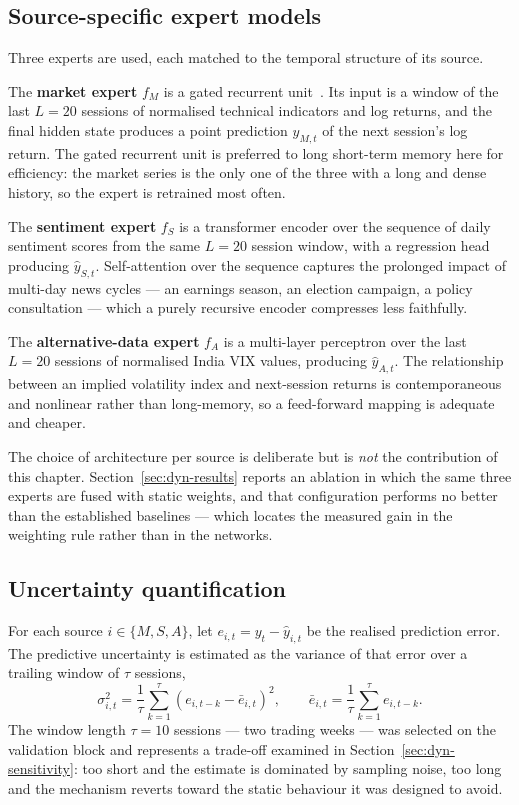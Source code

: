 \subsection{Source-specific expert models}

Three experts are used, each matched to the temporal structure of its source.

The \textbf{market expert} $f_M$ is a gated recurrent unit~\cite{cho2014gru}. Its input is a
window of the last $L = 20$ sessions of normalised technical indicators and log returns, and the
final hidden state produces a point prediction $\hat{y}_{M,t}$ of the next session's log return.
The gated recurrent unit is preferred to long short-term memory here for efficiency: the market
series is the only one of the three with a long and dense history, so the expert is retrained
most often.

The \textbf{sentiment expert} $f_S$ is a transformer encoder over the sequence of daily sentiment
scores from the same $L = 20$ session window, with a regression head producing $\hat{y}_{S,t}$.
Self-attention over the sequence captures the prolonged impact of multi-day news cycles --- an
earnings season, an election campaign, a policy consultation --- which a purely recursive encoder
compresses less faithfully.

The \textbf{alternative-data expert} $f_A$ is a multi-layer perceptron over the last $L = 20$
sessions of normalised India VIX values, producing $\hat{y}_{A,t}$. The relationship between an
implied volatility index and next-session returns is contemporaneous and nonlinear rather than
long-memory, so a feed-forward mapping is adequate and cheaper.

The choice of architecture per source is deliberate but is \emph{not} the contribution of this
chapter. Section~\ref{sec:dyn-results} reports an ablation in which the same three experts are
fused with static weights, and that configuration performs no better than the established
baselines --- which locates the measured gain in the weighting rule rather than in the networks.

\subsection{Uncertainty quantification}

For each source $i \in \{M, S, A\}$, let $e_{i,t} = y_t - \hat{y}_{i,t}$ be the realised
prediction error. The predictive uncertainty is estimated as the variance of that error over a
trailing window of $\tau$ sessions,
\begin{equation}
\sigma_{i,t}^2 = \frac{1}{\tau}\sum_{k=1}^{\tau}
\left(e_{i,t-k} - \bar{e}_{i,t}\right)^2,
\qquad
\bar{e}_{i,t} = \frac{1}{\tau}\sum_{k=1}^{\tau} e_{i,t-k}.
\label{eq:dyn-unc}
\end{equation}
The window length $\tau = 10$ sessions --- two trading weeks --- was selected on the validation
block and represents a trade-off examined in Section~\ref{sec:dyn-sensitivity}: too short and the
estimate is dominated by sampling noise, too long and the mechanism reverts toward the static
behaviour it was designed to avoid.

